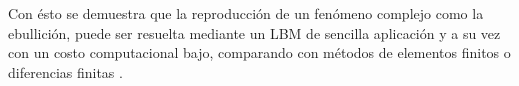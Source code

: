Con ésto se demuestra que la reproducción de un fenómeno complejo como la ebullición, puede ser resuelta mediante un LBM de sencilla aplicación y a su vez con un costo computacional bajo, comparando con métodos de elementos finitos o diferencias finitas \cite{guo2013lattice}.




\newpage

